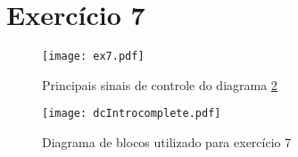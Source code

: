 \section*{Exercício 7}

\begin{figure}[H]
    \center
    \texttt{[image: ex7.pdf]}
    \caption{Principais sinais de controle do diagrama \ref{fig:dcIntrocomplete}}
    \label{fig:ex7}
\end{figure}

\begin{figure}[H]
    \center
    \texttt{[image: dcIntrocomplete.pdf]}
    \caption{Diagrama de blocos utilizado para exercício 7}
    \label{fig:dcIntrocomplete}
\end{figure}

